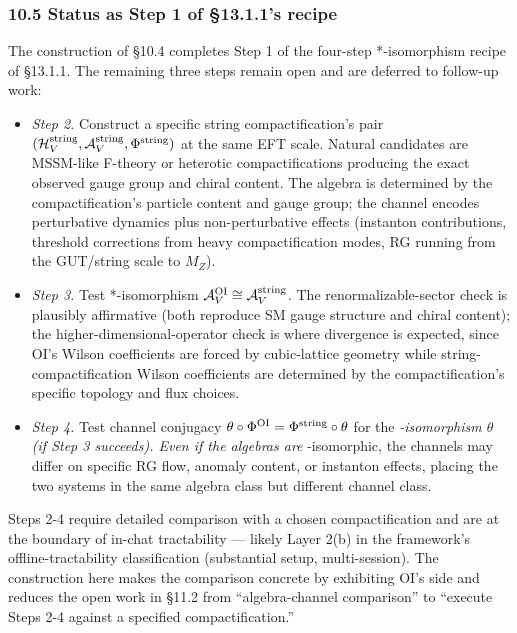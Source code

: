 \documentclass[
]{article}
\providecommand{\tightlist}{%
  \setlength{\itemsep}{0pt}\setlength{\parskip}{0pt}}
\begin{document}
\hypertarget{status-as-step-1-of-13.1.1s-recipe}{%
\subsubsection{10.5 Status as Step 1 of §13.1.1's
recipe}\label{status-as-step-1-of-13.1.1s-recipe}}

The construction of §10.4 completes Step 1 of the four-step
*-isomorphism recipe of §13.1.1. The remaining three steps remain open
and are deferred to follow-up work:

\begin{itemize}
\tightlist
\item
  \emph{Step 2.} Construct a specific string compactification's pair
  \((\mathcal{H}_V^{\rm string}, \mathcal{A}_V^{\rm string}, \Phi^{\rm string})\)
  at the same EFT scale. Natural candidates are MSSM-like F-theory or
  heterotic compactifications producing the exact observed gauge group
  and chiral content. The algebra is determined by the
  compactification's particle content and gauge group; the channel
  encodes perturbative dynamics plus non-perturbative effects (instanton
  contributions, threshold corrections from heavy compactification
  modes, RG running from the GUT/string scale to \(M_Z\)).
\item
  \emph{Step 3.} Test *-isomorphism
  \(\mathcal{A}_V^{\rm OI} \cong \mathcal{A}_V^{\rm string}\). The
  renormalizable-sector check is plausibly affirmative (both reproduce
  SM gauge structure and chiral content); the
  higher-dimensional-operator check is where divergence is expected,
  since OI's Wilson coefficients are forced by cubic-lattice geometry
  while string-compactification Wilson coefficients are determined by
  the compactification's specific topology and flux choices.
\item
  \emph{Step 4.} Test channel conjugacy
  \(\theta \circ \Phi^{\rm OI} = \Phi^{\rm string} \circ \theta\) for
  the \emph{-isomorphism \(\theta\) (if Step 3 succeeds). Even if the
  algebras are }-isomorphic, the channels may differ on specific RG
  flow, anomaly content, or instanton effects, placing the two systems
  in the same algebra class but different channel class.
\end{itemize}

Steps 2-4 require detailed comparison with a chosen compactification and
are at the boundary of in-chat tractability --- likely Layer 2(b) in the
framework's offline-tractability classification (substantial setup,
multi-session). The construction here makes the comparison concrete by
exhibiting OI's side and reduces the open work in §11.2 from
``algebra-channel comparison'' to ``execute Steps 2-4 against a
specified compactification.''
\end{document}
